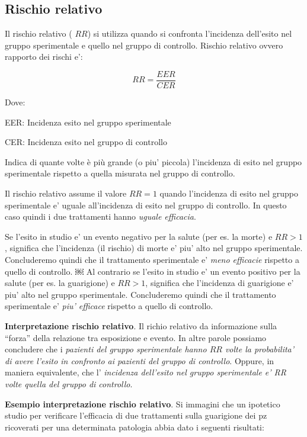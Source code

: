 \documentclass[]{book}
\begin{document}
\hypertarget{rischio-relativo}{%
\subsection{Rischio relativo}\label{rischio-relativo}}

Il rischio relativo ( \(RR\)) si utilizza quando si confronta l'incidenza dell'esito nel gruppo sperimentale e quello nel gruppo di controllo. Rischio relativo ovvero rapporto dei rischi e':

\[RR = \frac{ EER }{CER}\]

Dove:

EER: Incidenza esito nel gruppo sperimentale

CER: Incidenza esito nel gruppo di controllo

Indica di quante volte è più grande (o piu' piccola) l'incidenza di esito nel gruppo sperimentale rispetto a quella misurata nel gruppo di controllo.

Il rischio relativo assume il valore \(RR=1\) quando l'incidenza di esito nel gruppo sperimentale e' uguale all'incidenza di esito nel gruppo di controllo. In questo caso quindi i due trattamenti hanno \emph{uguale efficacia}.

Se l'esito in studio e' un evento negativo per la salute (per es. la morte) e \(RR>1\), significa che l'incidenza (il rischio) di morte e' piu' alto nel gruppo sperimentale. Concluderemo quindi che il trattamento sperimentale e' \emph{meno efficacie} rispetto a quello di controllo.
￼
Al contrario se l'esito in studio e' un evento positivo per la salute (per es. la guarigione) e \(RR>1\), significa che l'incidenza di guarigione e' piu' alto nel gruppo sperimentale. Concluderemo quindi che il trattamento sperimentale e' \emph{piu' efficace} rispetto a quello di controllo.

\textbf{Interpretazione rischio relativo}. Il richio relativo da informazione sulla ``forza'' della relazione tra esposizione e evento. In altre parole possiamo concludere che i \emph{pazienti del gruppo sperimentale hanno \(RR\) volte la probabilita' di avere l'esito in confronto ai pazienti del gruppo di controllo}. Oppure, in maniera equivalente, che l' \emph{incidenza dell'esito nel gruppo sperimentale e' RR volte quella del gruppo di controllo}.

\textbf{Esempio interpretazione rischio relativo}. Si immagini che un ipotetico studio per verificare l'efficacia di due trattamenti sulla guarigione dei pz ricoverati per una determinata patologia abbia dato i seguenti risultati:
\end{document}
